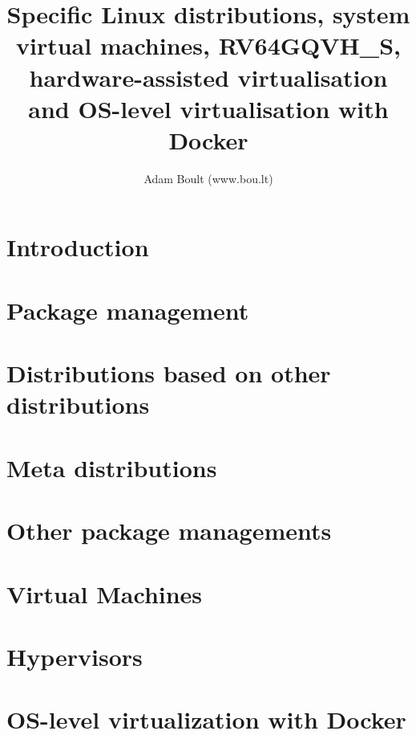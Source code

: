 \documentclass[oneside]{book}
\begin{document}
\author{Adam Boult (www.bou.lt)}
\title{Specific Linux distributions, system virtual machines, RV64GQVH\_S, hardware-assisted virtualisation and OS-level virtualisation with Docker}
\maketitle

\setcounter{tocdepth}{0}
\tableofcontents



\part{Introduction}


\part{Package management}











\part{Distributions based on other distributions}


\part{Meta distributions}


\part{Other package managements}



\part{Virtual Machines}


\part{Hypervisors}

\part{OS-level virtualization with Docker}

\end{document}
